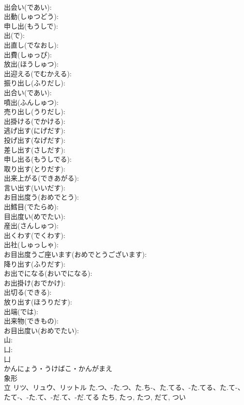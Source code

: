 \documentclass[8pt]{extreport}
\begin{document}
\begin{CJK}{UTF8}{min}
\\	出会い(であい): 
\\	出動(しゅつどう): 
\\	申し出(もうしで): 
\\	出(で): 
\\	出直し(でなおし): 
\\	出費(しゅっぴ): 
\\	放出(ほうしゅつ): 
\\	出迎える(でむかえる): 
\\	振り出し(ふりだし): 
\\	出合い(であい): 
\\	噴出(ふんしゅつ): 
\\	売り出し(うりだし): 
\\	出掛ける(でかける): 
\\	逃げ出す(にげだす): 
\\	投げ出す(なげだす): 
\\	差し出す(さしだす): 
\\	申し出る(もうしでる): 
\\	取り出す(とりだす): 
\\	出来上がる(できあがる): 
\\	言い出す(いいだす): 
\\	お目出度う(おめでとう): 
\\	出鱈目(でたらめ): 
\\	目出度い(めでたい): 
\\	産出(さんしゅつ): 
\\	出くわす(でくわす): 
\\	出社(しゅっしゃ): 
\\	お目出度うご座います(おめでとうございます): 
\\	降り出す(ふりだす): 
\\	お出でになる(おいでになる): 
\\	お出掛け(おでかけ): 
\\	出切る(できる): 
\\	放り出す(ほうりだす): 
\\	出端(では): 
\\	出来物(できもの): 
\\	お目出度い(おめでたい): 
\\	山: 
\\	凵: 
\\	凵	
\\	かんにょう・うけばこ・かんがまえ	
\\	象形 
\\	立	リツ、リュウ、リットル	た.つ、-た.つ、た.ち-、た.てる、-た.てる、た.て-、たて-、-た.て、-だ.て、-だ.てる	たち, たっ, たつ, だて, つい	

\end{CJK}
\end{document}
